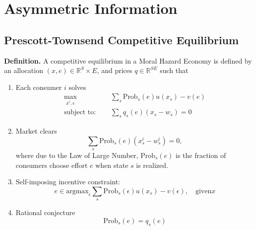 \chapter{Asymmetric Information}
\section{Prescott-Townsend Competitive Equilibrium}
\noindent \textbf{Definition.} 
A competitive equilibrium in a Moral Hazard Economy is defined by 
an allocation $(x, e) \in \mathbb{R}^S \times E$, 
and prices $q \in \mathbb{R}^{SE}$ such that 
\begin{enumerate}
    \item Each consumer $i$ solves 
    \begin{align*}
        \max_{x^i, e} \quad & \sum_s \text{Prob}_s(e) u(x_s) - v(e) \\ 
        \text{subject to: } \quad & \sum_s q_s(e) (x_s - w_s ) = 0 
    \end{align*}
    \item Market clears 
    \[
    \sum_s \text{Prob}_s(e) (x^i_s - w^i_s) = 0,
    \]
    where due to the Law of Large Number, $\text{Prob}_s(e)$ is the fraction of 
    consumers choose effort $e$ when state $s$ is realized.
    \item Self-imposing incentive constraint:
    \[
    e \in \text{argmax}_\epsilon \sum_s \text{Prob}_s(\epsilon) u(x_s) - v(\epsilon), \quad \text{given} x
    \]
    \item Rational conjecture
    \[
        \text{Prob}_s(e) = q_s(e)
    \]
\end{enumerate}



